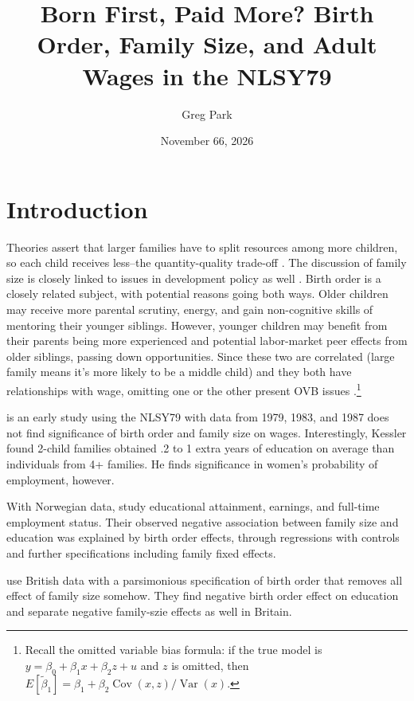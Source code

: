 \documentclass[12pt]{article}
\title{Born First, Paid More? Birth Order, Family Size, and Adult Wages in the NLSY79}
\author{Greg Park}
\date{November 66, 2026}
\begin{document}
\maketitle

\begin{abstract}
\end{abstract}

\section{Introduction}
Theories assert that larger families have to split resources among more children, so each child receives less--the quantity-quality trade-off \citep{becker76}. The discussion of family size is closely linked to issues in development policy as well \citep{angrist}. Birth order is a closely related subject, with potential reasons going both ways. Older children may receive more parental scrutiny, energy, and gain non-cognitive skills of mentoring their younger siblings. However, younger children may benefit from their parents being more experienced and potential labor-market peer effects from older siblings, passing down opportunities. Since these two are correlated (large family means it's more likely to be a middle child) and they both have relationships with wage, omitting one or the other present OVB issues \citep{black17}.\footnote{Recall the omitted variable bias formula: if the true model is $y = \beta_0 + \beta_1 x + \beta_2 z + u$ and $z$ is omitted, then $E[\tilde{\beta}_1] = \beta_1 + \beta_2 \operatorname{Cov}(x,z)/\operatorname{Var}(x)$.}

\citet{kess} is an early study using the NLSY79 with data from 1979, 1983, and 1987 does not find significance of birth order and family size on wages. Interestingly, Kessler found 2-child families obtained .2 to 1 extra years of education on average than individuals from 4+ families. He finds significance in women's probability of employment, however. 

With Norwegian data, \citet{black} study educational attainment, earnings, and full-time employment status. Their observed negative association between family size and education was explained by birth order effects, through regressions with controls and further specifications including family fixed effects. 

\citet{booth} use British data with a parsimonious specification of birth order that removes all effect of family size somehow. They find negative birth order effect on education and separate negative family-szie effects as well in Britain.
\end{document}
